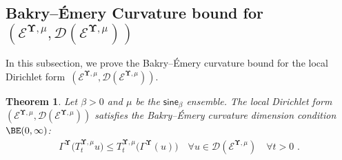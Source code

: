 \documentclass[11pt,letterpaper]{amsart}
\newcommand{\dom}[1]{\mathcal D(#1)}
\newcommand{\diff}{\mathop{}\!\mathrm{d}}
\newcommand{\fstop}{\,\,\mathrm{.}}
\newcommand{\cdc}{\Gamma}
\newcommand{\QP}{{\mu}}
\newcommand{\dUpsilon}{{\mathbf \Upsilon}}
\newcommand{\U}{\dUpsilon}
\newcommand{\sine}{\mathsf{sine}}
\newcommand{\E}{\mathcal E}
\renewcommand{\1}{\mathbf 1}
\numberwithin{equation}{section}
\theoremstyle{plain}
\newtheorem{thm}{Theorem}[section]
\newtheorem{lem}[thm]{Lemma}%
\theoremstyle{definition}
\theoremstyle{remark}
\renewcommand{\paragraph}[1]{\medskip\emph{#1}.\quad}
\begin{document}
\subsection{Bakry--\'Emery Curvature bound for $(\E^{\U, \QP}, \dom{\E^{\U, \QP}})$}
In this subsection, we prove the Bakry--\'Emery curvature bound for the local Dirichlet form~$(\E^{\U, \QP}, \dom{\E^{\U, \QP}})$.
\begin{thm} \label{t: main}
Let $\beta>0$ and $\mu$ be the $\sine_\beta$ ensemble. The local Dirichlet form~$(\E^{\U, \QP}, \dom{\E^{\U, \QP}})$ satisfies the Bakry--\'Emery curvature dimension condition $\BE(0,\infty)$:
\begin{align} \label{m:BE}
\cdc^{\U}\bigl(T_t^{\U, \mu} u\bigr) \le T_t^{\U, \mu} \bigl(\cdc^{\U}(u)\bigr) \quad \forall u \in  \dom{\E^{\U, \mu}} \quad \forall t>0\fstop \tag{$\BE(0,\infty)$}
\end{align}
\end{thm}


\end{document}
